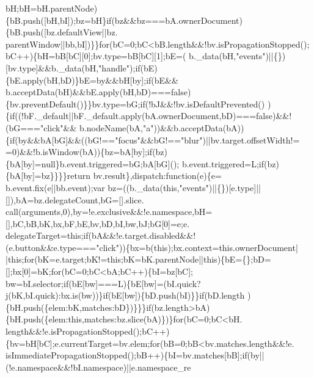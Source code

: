 \begin{DoxyCode}
      bH;bH=bH.parentNode)\{bB.push([bH,bI]);bz=bH\}\textcolor{keywordflow}{if}(bz&&bz===bA.ownerDocument)\{bB.push([bz.defaultView||bz.
      parentWindow||bb,bI])\}\}\textcolor{keywordflow}{for}(bC=0;bC<bB.length&&!bv.isPropagationStopped();bC++)\{bH=bB[bC][0];bv.type=bB[bC][1];bE=(
      b.\_data(bH,\textcolor{stringliteral}{"events"})||\{\})[bv.type]&&b.\_data(bH,\textcolor{stringliteral}{"handle"});\textcolor{keywordflow}{if}(bE)\{bE.apply(bH,bD)\}bE=by&&bH[by];\textcolor{keywordflow}{if}(bE&&
      b.acceptData(bH)&&bE.apply(bH,bD)===\textcolor{keyword}{false})\{bv.preventDefault()\}\}bv.type=bG;\textcolor{keywordflow}{if}(!bJ&&!bv.isDefaultPrevented()
      )\{\textcolor{keywordflow}{if}((!bF.\_default||bF.\_default.apply(bA.ownerDocument,bD)===\textcolor{keyword}{false})&&!(bG===\textcolor{stringliteral}{"click"}&&
      b.nodeName(bA,\textcolor{stringliteral}{"a"}))&&b.acceptData(bA))\{\textcolor{keywordflow}{if}(by&&bA[bG]&&((bG!==\textcolor{stringliteral}{"focus"}&&bG!==\textcolor{stringliteral}{"blur"})||bv.target.offsetWidth!=
      =0)&&!b.isWindow(bA))\{bz=bA[by];\textcolor{keywordflow}{if}(bz)\{bA[by]=null\}b.event.triggered=bG;bA[bG]();
      b.event.triggered=L;\textcolor{keywordflow}{if}(bz)\{bA[by]=bz\}\}\}\}\textcolor{keywordflow}{return} bv.result\},dispatch:\textcolor{keyword}{function}(e)\{e=
      b.event.fix(e||bb.event);var bz=((b.\_data(\textcolor{keyword}{this},\textcolor{stringliteral}{"events"})||\{\})[e.type]||[]),bA=bz.delegateCount,bG=[].slice.
      call(arguments,0),by=!e.exclusive&&!e.namespace,bH=[],bC,bB,bK,bx,bF,bE,bv,bD,bI,bw,bJ;bG[0]=e;e.
      delegateTarget=\textcolor{keyword}{this};\textcolor{keywordflow}{if}(bA&&!e.target.disabled&&!(e.button&&e.type===\textcolor{stringliteral}{"click"}))\{bx=b(\textcolor{keyword}{this});bx.context=this.ownerDocument|
      |\textcolor{keyword}{this};\textcolor{keywordflow}{for}(bK=e.target;bK!=\textcolor{keyword}{this};bK=bK.parentNode||\textcolor{keyword}{this})\{bE=\{\};bD=[];bx[0]=bK;\textcolor{keywordflow}{for}(bC=0;bC<bA;bC++)\{bI=bz[bC];
      bw=bI.selector;\textcolor{keywordflow}{if}(bE[bw]===L)\{bE[bw]=(bI.quick?j(bK,bI.quick):bx.is(bw))\}if(bE[bw])\{bD.push(bI)\}\}\textcolor{keywordflow}{if}(bD.length
      )\{bH.push(\{elem:bK,matches:bD\})\}\}\}\textcolor{keywordflow}{if}(bz.length>bA)\{bH.push(\{elem:\textcolor{keyword}{this},matches:bz.slice(bA)\})\}\textcolor{keywordflow}{for}(bC=0;bC<bH.
      length&&!e.isPropagationStopped();bC++)\{bv=bH[bC];e.currentTarget=bv.elem;\textcolor{keywordflow}{for}(bB=0;bB<bv.matches.length&&!e.
      isImmediatePropagationStopped();bB++)\{bI=bv.matches[bB];\textcolor{keywordflow}{if}(by||(!e.namespace&&!bI.namespace)||e.namespace\_re

\end{DoxyCode}
